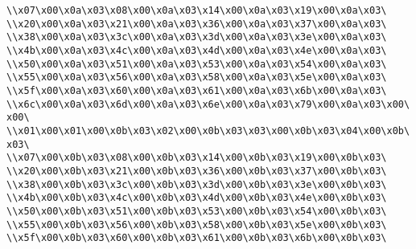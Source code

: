 \verb|\\x07\x00\x0a\x03\x08\x00\x0a\x03\x14\x00\x0a\x03\x19\x00\x0a\x03\|\newline
\verb|\\x20\x00\x0a\x03\x21\x00\x0a\x03\x36\x00\x0a\x03\x37\x00\x0a\x03\|\newline
\verb|\\x38\x00\x0a\x03\x3c\x00\x0a\x03\x3d\x00\x0a\x03\x3e\x00\x0a\x03\|\newline
\verb|\\x4b\x00\x0a\x03\x4c\x00\x0a\x03\x4d\x00\x0a\x03\x4e\x00\x0a\x03\|\newline
\verb|\\x50\x00\x0a\x03\x51\x00\x0a\x03\x53\x00\x0a\x03\x54\x00\x0a\x03\|\newline
\verb|\\x55\x00\x0a\x03\x56\x00\x0a\x03\x58\x00\x0a\x03\x5e\x00\x0a\x03\|\newline
\verb|\\x5f\x00\x0a\x03\x60\x00\x0a\x03\x61\x00\x0a\x03\x6b\x00\x0a\x03\|\newline
\verb|\\x6c\x00\x0a\x03\x6d\x00\x0a\x03\x6e\x00\x0a\x03\x79\x00\x0a\x03\x00\x00\|\newline
\verb|\\x01\x00\x01\x00\x0b\x03\x02\x00\x0b\x03\x03\x00\x0b\x03\x04\x00\x0b\x03\|\newline
\verb|\\x07\x00\x0b\x03\x08\x00\x0b\x03\x14\x00\x0b\x03\x19\x00\x0b\x03\|\newline
\verb|\\x20\x00\x0b\x03\x21\x00\x0b\x03\x36\x00\x0b\x03\x37\x00\x0b\x03\|\newline
\verb|\\x38\x00\x0b\x03\x3c\x00\x0b\x03\x3d\x00\x0b\x03\x3e\x00\x0b\x03\|\newline
\verb|\\x4b\x00\x0b\x03\x4c\x00\x0b\x03\x4d\x00\x0b\x03\x4e\x00\x0b\x03\|\newline
\verb|\\x50\x00\x0b\x03\x51\x00\x0b\x03\x53\x00\x0b\x03\x54\x00\x0b\x03\|\newline
\verb|\\x55\x00\x0b\x03\x56\x00\x0b\x03\x58\x00\x0b\x03\x5e\x00\x0b\x03\|\newline
\verb|\\x5f\x00\x0b\x03\x60\x00\x0b\x03\x61\x00\x0b\x03\x6b\x00\x0b\x03\|\newline
